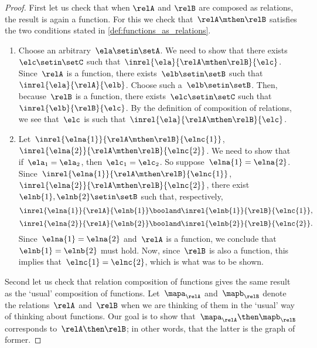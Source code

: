 \begin{proof}
    First let us check that when $\relA$ and $\relB$ are composed as relations, the result is again a function.
    For this we check that~$\relA \mthen \relB$ satisfies the two conditions stated in \cref{def:functions_as_relations}.

    \begin{enumerate}
        \item Choose an arbitrary~$\ela \setin \setA$.
              We need to show that there exists~$\elc \setin \setC$ such that~$\inrel{\ela}{\relA \mthen \relB}{\elc}$.
              Since~$\relA$ is a function, there exists~$\elb \setin \setB$ such that~$\inrel{\ela}{\relA}{\elb}$.
              Choose such a~$\elb \setin \setB$.
              Then, because~$\relB$ is a function, there exists~$\elc \setin \setC$ such that~$\inrel{\elb}{\relB}{\elc}$.
              By the definition of composition of relations, we see that~$\elc$ is such that~$\inrel{\ela}{\relA \mthen \relB}{\elc}$.
        \item Let~$\inrel{\elna{1}}{\relA \mthen \relB}{\elnc{1}}$,~$\inrel{\elna{2}}{\relA \mthen \relB}{\elnc{2}}$.
              We need to show that if~$\ela_1 = \ela_2$, then~$\elc_1 = \elc_2$.
              So suppose~$\elna{1} = \elna{2}$.
              Since~$\inrel{\elna{1}}{\relA \mthen \relB}{\elnc{1}}$,~$\inrel{\elna{2}}{\relA \mthen \relB}{\elnc{2}}$, there exist~$\elnb{1}, \elnb{2} \setin \setB$ such that, respectively,
              \begin{equation}
                  \inrel{\elna{1}}{\relA}{\elnb{1}} \booland \inrel{\elnb{1}}{\relB}{\elnc{1}},
              \end{equation}
              \begin{equation}
                  \inrel{\elna{2}}{\relA}{\elnb{2}} \booland \inrel{\elnb{2}}{\relB}{\elnc{2}}.
              \end{equation}
              Since~$\elna{1} = \elna{2}$ and~$\relA$ is a function, we conclude that~$\elnb{1} = \elnb{2}$ must hold.
              Now, since~$\relB$ is also a function, this implies that~$\elnc{1} = \elnc{2}$, which is what was to be shown.
    \end{enumerate}

    Second let us check that relation composition of functions gives the same result as the `usual' composition of functions.
    Let~$\mapa_\relA$ and~$\mapb_\relB$ denote the relations~$\relA$ and~$\relB$ when we are thinking of them in the `usual' way of thinking about functions.
    Our goal is to show that~$\mapa_\relA \then \mapb_\relB$ corresponds to~$\relA \then \relB$; in other words, that the latter is the graph of former.


\end{proof}
